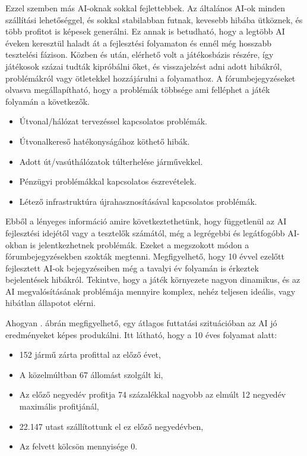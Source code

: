 Ezzel szemben más AI-oknak sokkal fejlettebbek. Az általános AI-ok minden szállítási lehetőséggel, és sokkal stabilabban futnak, kevesebb hibába ütköznek, és több profitot is képesek generálni. Ez annak is betudható, hogy a legtöbb AI éveken keresztül haladt át a fejlesztési folyamaton és ennél még hosszabb tesztelési fázison. Közben és után, elérhető volt a játékosbázis részére, így játékosok százai tudták kipróbálni őket, és visszajelzést adni adott hibákról, problémákról vagy ötletekkel hozzájárulni a folyamathoz. A fórumbejegyzéseket olvasva megállapítható, hogy a problémák többsége ami felléphet a játék folyamán a következők.
\begin{itemize}
	\item Útvonal/hálózat tervezéssel kapcsolatos problémák.
	\item Útvonalkereső hatékonyságához köthető hibák.
	\item Adott út/vasúthálózatok túlterhelése járművekkel.
	\item Pénzügyi problémákkal kapcsolatos észrevételek.
	\item Létező infrastruktúra újrahasznosításával kapcsolatos problémák.
\end{itemize}
Ebből a lényeges információ amire következtethetünk, hogy függetlenül az AI fejlesztési idejétől vagy a tesztelők számától, még a legrégebbi és legátfogóbb AI-okban is jelentkezhetnek problémák. Ezeket a megszokott módon a fórumbejegyzésekben szokták megtenni. Megfigyelhető, hogy 10 évvel ezelőtt fejlesztett AI-ok bejegyzéseiben még a tavalyi év folyamán is érkeztek bejelentések hibákról. Tekintve, hogy a játék környezete nagyon dinamikus, és az AI megvalósításának problémája mennyire komplex, nehéz teljesen ideális, vagy hibátlan állapotot elérni.

Ahogyan . ábrán megfigyelhető, egy átlagos futtatási szituációban az AI jó eredményeket képes produkálni. Itt látható, hogy a 10 éves folyamat alatt:
\begin{itemize}
	\item 152 jármű zárta profittal az előző évet,
	\item A közelmúltban 67 állomást szolgált ki,
	\item Az előző negyedév profitja 74 százalékkal nagyobb az elmúlt 12 negyedév maximális profitjánál,
	\item 22.147 utast szállítottunk el ez előző negyedévben,
	\item Az felvett kölcsön mennyisége 0.
\end{itemize}


